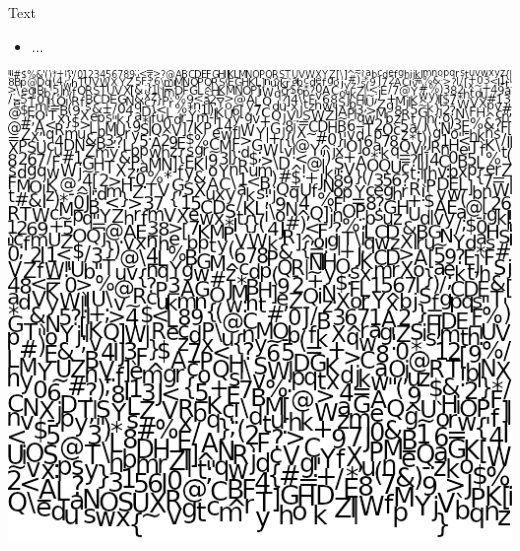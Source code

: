 \documentclass{lug}
\newcommand{\splitslide}[4]{
    \noindent
    \begin{minipage}{#1 \textwidth - #2 }
        #3
    \end{minipage}%
    \hspace{ \dimexpr #2 * 2 \relax }%
    \begin{minipage}{\textwidth - #1 \textwidth - #2 }
        #4
    \end{minipage}
}
\begin{document}
\begin{frame}{Text}
    \splitslide{0.65}{.7em}{
        \small
        \begin{itemize}
            \item ...
        \end{itemize}
    }{
        \includegraphics[width=\textwidth]{graphics/freetype_atlas}
    }
\end{frame}
\end{document}
